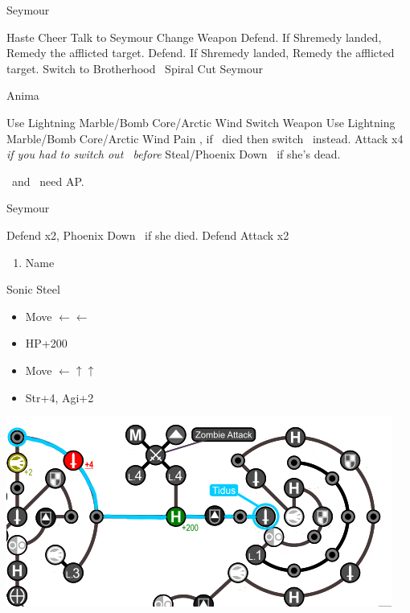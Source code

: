 \begin{battle}[3000]{Seymour}
	\begin{itemize}
		\tidusf Haste \tidus
		\tidusf Cheer
		\tidusf Talk to Seymour
		\yunaf Change Weapon
		\switch{\kimahri}{\rikku}
		\rikkuf Defend. If Shremedy landed, Remedy the afflicted target.
		\switch{\yuna}{\kimahri}
		\kimahrif Defend. If Shremedy landed, Remedy the afflicted target.
		\tidusf Switch to Brotherhood
		\tidusf \od\ Spiral Cut Seymour
	\end{itemize}
\end{battle}
\vfill
\begin{battle}[18000]{Anima}
	\begin{itemize}
		\rikkuf Use Lightning Marble/Bomb Core/Arctic Wind
		\switch{\tidus}{\wakka}
		\wakkaf Switch Weapon
		\kimahrif Use Lightning Marble/Bomb Core/Arctic Wind
		\enemyf Pain
		\switch{\wakka}{\tidus}, if \wakka\ died then switch \rikku\ instead.
		\tidusf Attack x4
		\switch{\kimahri}{\rikku} \textit{if you had to switch out \rikku\ before}
		\rikkuf Steal/Phoenix Down \yuna\ if she's dead.
	\end{itemize}
	\tidus\ and \yuna\ need AP.
\end{battle}
\begin{battle}[6000]{Seymour}
	\begin{itemize}
	      \tidusf Defend x2, Phoenix Down \rikku\ if she died.
	      \rikkuf Defend
	      \tidusf Attack x2
	\end{itemize}
\end{battle}
\begin{enumerate}[resume]
	\item Name \shiva
\end{enumerate}
\begin{equip}
	\begin{itemize}
		\tidusf Sonic Steel
	\end{itemize}
\end{equip}
\begin{spheregrid}
	\begin{itemize}
		\tidusf
		\begin{itemize}
			\item Move $\leftarrow\leftarrow$
			\item HP+200
			\item Move $\leftarrow\uparrow\uparrow$
			\item Str+4, Agi+2
		\end{itemize}
		\includegraphics[width=.8\columnwidth]{graphics/Tidus_Post_Seymour}
	\end{itemize}
\end{spheregrid}

